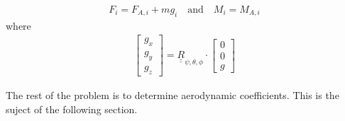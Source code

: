 \documentclass[a4paper, 12pt]{book}
\begin{document}
\begin{align}
    F_i = F_{A, i} + m g_i \quad\text{and}\quad M_i = M_{A, i}
\end{align}
where
\begin{align}
    \begin{bmatrix}
        g_x \\
        g_y \\
        g_z
    \end{bmatrix} =
    \underline{\underline{R}}_{\psi, \theta, \phi}
    \cdot
    \begin{bmatrix}
        0 \\
        0 \\
        g
    \end{bmatrix}
\end{align}

The rest of the problem is to determine aerodynamic coefficients. This is the suject of the following section.
\end{document}
